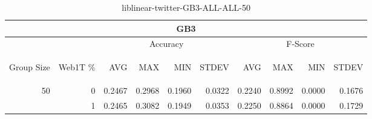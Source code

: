 \begin{center}
\begin{table}[htbp] 
 \begin{center}
\begin{tabular}{ | r | r | r | r | r | r | r | r | r | r |}
\hline
\multicolumn{10}{|c|}{GB3}\\
\hline
 & & \multicolumn{4}{|c|}{Accuracy} & \multicolumn{4}{|c|}{F-Score}\\ \cline{3-10}
\begin{sideways}Group Size\end{sideways} & \begin{sideways}Web1T \%\end{sideways} & \begin{sideways}AVG\end{sideways} & \begin{sideways}MAX\end{sideways} & \begin{sideways}MIN\end{sideways} & \begin{sideways}STDEV\end{sideways} & \begin{sideways}AVG\end{sideways} & \begin{sideways}MAX\end{sideways} & \begin{sideways}MIN\end{sideways} & \begin{sideways}STDEV\end{sideways}\\
\hline
\multirow{1}{*}{50}
 & 0 & 0.2467 & 0.2968 & 0.1960 & 0.0322 & 0.2240 & 0.8992 & 0.0000 & 0.1676\\ \cline{2-10}
 & 1 & 0.2465 & 0.3082 & 0.1949 & 0.0353 & 0.2250 & 0.8864 & 0.0000 & 0.1729\\ \cline{2-10}
\hline
\end{tabular}
\caption{liblinear-twitter-GB3-ALL-ALL-50}
\label{table:liblinear-twitter-GB3-ALL-ALL-50}
\end{center}
 \end{table}
\end{center}

